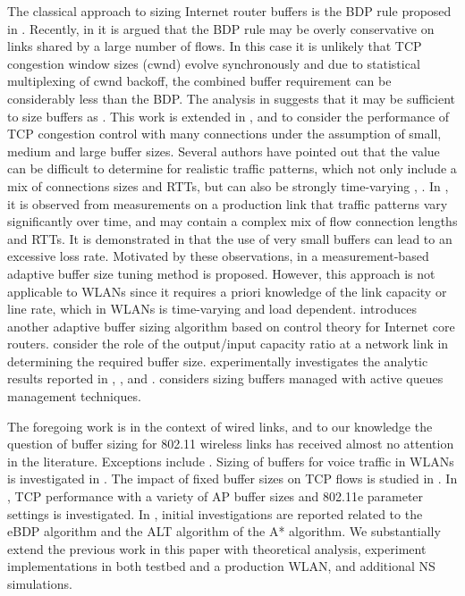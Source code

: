 \documentclass[10pt,twocolumn, journal]{IEEEtran}
\begin{document}
The classical approach to sizing Internet router buffers is the BDP rule proposed in
\cite{Vallamizar_CCR_1994}. Recently, in \cite{Appenzeller_SIGCOMM_2004} it is argued
that the BDP rule may be overly conservative on links shared by a large number of flows.
In this case it is unlikely that TCP congestion window sizes (cwnd) evolve synchronously
and due to statistical multiplexing of cwnd backoff, the combined buffer requirement can
be considerably less than the BDP. The analysis in \cite{Appenzeller_SIGCOMM_2004}
suggests that it may be sufficient to size buffers as .  This work is
extended in \cite{Raina_NGI_2005}, \cite{Enachescu_INFOCOM_2006} and
\cite{Wischik_CCR_2005} to consider the performance of TCP congestion control with many
connections under the assumption of small, medium and large buffer sizes. Several authors
have pointed out that the value  can be difficult to determine for realistic traffic
patterns, which not only include a mix of connections sizes and RTTs, but can also be
strongly time-varying \cite{Dhamdhere_ccr_2006}, \cite{Vu-Brugier_CCR_2007}. In
\cite{Vu-Brugier_CCR_2007}, it is observed from measurements on a production link that
traffic patterns vary significantly over time, and may contain a complex mix of flow
connection lengths and RTTs. It is demonstrated in
\cite{Dhamdhere_ccr_2006}\cite{Vu-Brugier_CCR_2007} that the use of very small buffers
can lead to an excessive loss rate.  Motivated by these observations, in
\cite{Rade_Letters_2006} \cite{Kellett_CDC_2006} a measurement-based adaptive buffer size
tuning method is proposed.  However, this approach is not applicable to WLANs since it
requires a priori knowledge of the link capacity or line rate, which in WLANs is
time-varying and load dependent.  \cite{Zhang_Iwqos_2008} introduces another adaptive buffer sizing algorithm based on control theory for Internet core routers. \cite{Prasad_ton_toappear,Lakshmikantha_infocom_2008} consider the role of the output/input capacity ratio at a network link in determining the required buffer size. \cite{Beheshti_imc_2008} experimentally investigates the analytic results reported in \cite{Appenzeller_SIGCOMM_2004}, \cite{Raina_NGI_2005}, \cite{Enachescu_INFOCOM_2006} and \cite{Wischik_CCR_2005}.   \cite{Eun_Ton_2008} considers sizing buffers managed with active queues management techniques.

The foregoing work is in the context of wired links, and to our knowledge the question of
buffer sizing for 802.11 wireless links has received almost no attention in the
literature. Exceptions include \cite{Malone_BufferSizing_voip}
\cite{Pilosof_INFOCOM_2003} \cite{Thottan_wicon_2006}. Sizing of buffers for voice
traffic in WLANs is investigated in \cite{Malone_BufferSizing_voip}.  The impact of fixed
buffer sizes on TCP flows is studied in \cite{Pilosof_INFOCOM_2003}. In
\cite{Thottan_wicon_2006}, TCP performance with a variety of AP buffer sizes and 802.11e
parameter settings is investigated.  In \cite{Li_commletter_2007}
\cite{Li_chinacom_2008}, initial investigations are reported related to the eBDP
algorithm and the ALT algorithm of the A* algorithm. We substantially extend the previous
work in this paper with theoretical analysis, experiment implementations in both testbed
and a production WLAN, and additional NS simulations.
\end{document}
